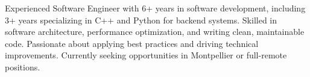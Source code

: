 

\begin{cvparagraph}

Experienced Software Engineer with 6+ years in software development, including 3+ years specializing in C++ and Python for backend systems. Skilled in software architecture, performance optimization, and writing clean, maintainable code. Passionate about applying best practices and driving technical improvements. Currently seeking opportunities in Montpellier or full-remote positions.\end{cvparagraph}
